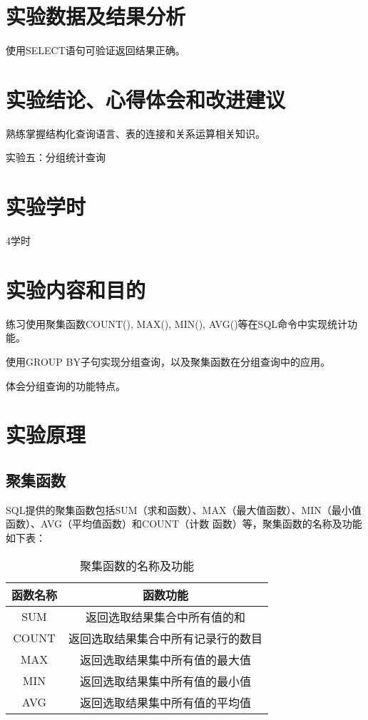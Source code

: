 \documentclass[a4paper]{uestcreport}
\begin{document}
\section{实验数据及结果分析}
使用SELECT语句可验证返回结果正确。

\section{实验结论、心得体会和改进建议}
熟练掌握结构化查询语言、表的连接和关系运算相关知识。

\newpage
\begin{center}
    \Large
    实验五：分组统计查询
\end{center}

\setcounter{section}{0}
\section{实验学时}
4学时

\section{实验内容和目的}
练习使用聚集函数COUNT(), MAX(), MIN(), AVG()等在SQL命令中实现统计功能。

使用GROUP BY子句实现分组查询，以及聚集函数在分组查询中的应用。

体会分组查询的功能特点。

\section{实验原理}
\subsection{聚集函数}
SQL提供的聚集函数包括SUM（求和函数）、MAX（最大值函数）、MIN（最小值函数）、AVG（平均值函数）和COUNT（计数
函数）等，聚集函数的名称及功能如下表：
\begin{table}[!h]
    \centering
    \caption{聚集函数的名称及功能}\label{tab:funcsTable}%
    \begin{tabular}{|c|c|}
        \hline
        函数名称 & 函数功能                           \\
        \hline
        SUM      & 返回选取结果集合中所有值的和       \\
        \hline
        COUNT    & 返回选取结果集合中所有记录行的数目 \\
        \hline
        MAX      & 返回选取结果集中所有值的最大值     \\
        \hline
        MIN      & 返回选取结果集中所有值的最小值     \\
        \hline
        AVG      & 返回选取结果集中所有值的平均值     \\
        \hline
    \end{tabular}
\end{table}
\end{document}

